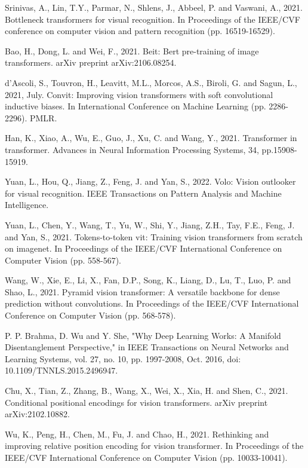 \begin{thebibliography}{ widest-label }
	Srinivas, A., Lin, T.Y., Parmar, N., Shlens, J., Abbeel, P. and Vaswani, A., 2021. Bottleneck transformers for visual recognition. In Proceedings of the IEEE/CVF conference on computer vision and pattern recognition (pp. 16519-16529).
	
	Bao, H., Dong, L. and Wei, F., 2021. Beit: Bert pre-training of image transformers. arXiv preprint arXiv:2106.08254.
	
	d’Ascoli, S., Touvron, H., Leavitt, M.L., Morcos, A.S., Biroli, G. and Sagun, L., 2021, July. Convit: Improving vision transformers with soft convolutional inductive biases. In International Conference on Machine Learning (pp. 2286-2296). PMLR.
	
	Han, K., Xiao, A., Wu, E., Guo, J., Xu, C. and Wang, Y., 2021. Transformer in transformer. Advances in Neural Information Processing Systems, 34, pp.15908-15919.
	
	Yuan, L., Hou, Q., Jiang, Z., Feng, J. and Yan, S., 2022. Volo: Vision outlooker for visual recognition. IEEE Transactions on Pattern Analysis and Machine Intelligence.
	
	Yuan, L., Chen, Y., Wang, T., Yu, W., Shi, Y., Jiang, Z.H., Tay, F.E., Feng, J. and Yan, S., 2021. Tokens-to-token vit: Training vision transformers from scratch on imagenet. In Proceedings of the IEEE/CVF International Conference on Computer Vision (pp. 558-567).
	
	Wang, W., Xie, E., Li, X., Fan, D.P., Song, K., Liang, D., Lu, T., Luo, P. and Shao, L., 2021. Pyramid vision transformer: A versatile backbone for dense prediction without convolutions. In Proceedings of the IEEE/CVF International Conference on Computer Vision (pp. 568-578).
	
	P. P. Brahma, D. Wu and Y. She, "Why Deep Learning Works: A Manifold Disentanglement Perspective," in IEEE Transactions on Neural Networks and Learning Systems, vol. 27, no. 10, pp. 1997-2008, Oct. 2016, doi: 10.1109/TNNLS.2015.2496947.
	
	Chu, X., Tian, Z., Zhang, B., Wang, X., Wei, X., Xia, H. and Shen, C., 2021. Conditional positional encodings for vision transformers. arXiv preprint arXiv:2102.10882.
	
	Wu, K., Peng, H., Chen, M., Fu, J. and Chao, H., 2021. Rethinking and improving relative position encoding for vision transformer. In Proceedings of the IEEE/CVF International Conference on Computer Vision (pp. 10033-10041).
	

\end{thebibliography}
